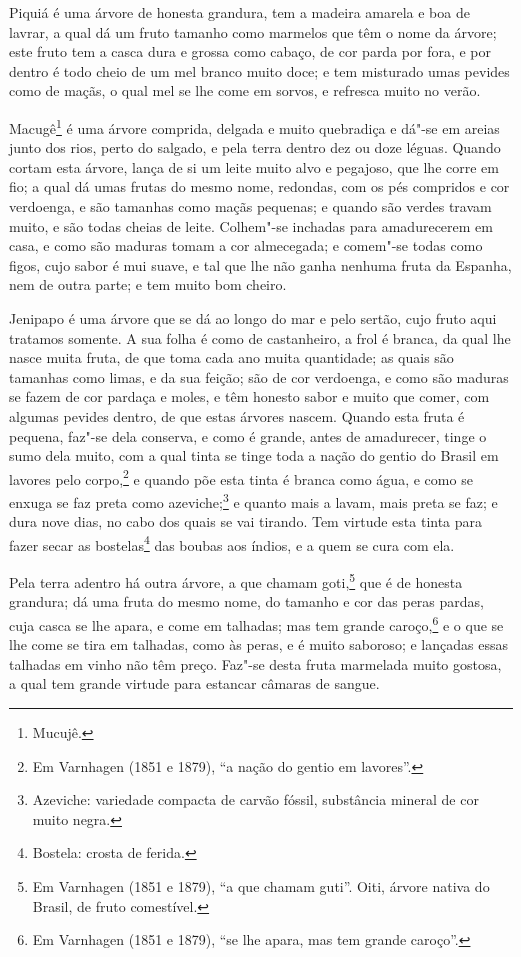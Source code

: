 Piquiá é uma árvore de honesta grandura, tem a madeira amarela e boa de lavrar, a qual dá
um fruto tamanho como marmelos que têm o nome da árvore; este fruto tem a casca dura e
grossa como cabaço, de cor parda por fora, e por dentro é todo cheio de um mel branco
muito doce; e tem misturado umas pevides como de maçãs, o qual mel se lhe come em sorvos,
e refresca muito no verão.

Macugê\footnote{ Mucujê.} é uma árvore comprida, delgada e muito quebradiça e dá"-se em
areias junto dos rios, perto do salgado, e pela terra dentro dez ou doze léguas. Quando
cortam esta árvore, lança de si um leite muito alvo e pegajoso, que lhe corre em fio; a
qual dá umas frutas do mesmo nome, redondas, com os pés compridos e cor verdoenga, e são
tamanhas como maçãs pequenas; e quando são verdes travam muito, e são todas cheias de
leite. Colhem"-se inchadas para amadurecerem em casa, e como são maduras tomam a cor
almecegada; e comem"-se todas como figos, cujo sabor é mui suave, e tal que lhe não ganha
nenhuma fruta da Espanha, nem de outra parte; e tem muito bom cheiro.

Jenipapo é uma árvore que se dá ao longo do mar e pelo sertão, cujo fruto aqui tratamos
somente. A sua folha é como de castanheiro, a frol é branca, da qual lhe nasce muita
fruta, de que toma cada ano muita quantidade; as quais são tamanhas como limas, e da sua
feição; são de cor verdoenga, e como são maduras se fazem de cor pardaça e moles, e têm
honesto sabor e muito que comer, com algumas pevides dentro, de que estas árvores nascem.
Quando esta fruta é pequena, faz"-se dela conserva, e como é grande, antes de amadurecer,
tinge o sumo dela muito, com a qual tinta se tinge toda a nação do gentio do Brasil em
lavores pelo corpo,\footnote{ Em Varnhagen (1851 e 1879), ``a nação do gentio em
lavores''.} e quando põe esta tinta é branca como água, e como se enxuga se faz preta como
azeviche;\footnote{ Azeviche: variedade compacta de carvão fóssil, substância mineral de
cor muito negra.} e quanto mais a lavam, mais preta se faz; e dura nove dias, no cabo dos
quais se vai tirando. Tem virtude esta tinta para fazer secar as bostelas\footnote{
Bostela: crosta de ferida.} das boubas aos índios, e a quem se cura com ela.


Pela terra adentro há outra árvore, a que chamam goti,\footnote{ Em Varnhagen (1851 e
1879), ``a que chamam guti''. Oiti, árvore nativa do Brasil, de fruto comestível.} que é
de honesta grandura; dá uma fruta do mesmo nome, do tamanho e cor das peras pardas, cuja
casca se lhe apara, e come em talhadas; mas tem grande caroço,\footnote{ Em Varnhagen
(1851 e 1879), ``se lhe apara, mas tem grande caroço''.} e o que se lhe come se tira em
talhadas, como às peras, e é muito saboroso; e lançadas essas talhadas em vinho não têm
preço. Faz"-se desta fruta marmelada muito gostosa, a qual tem grande virtude para estancar
câmaras de sangue.

